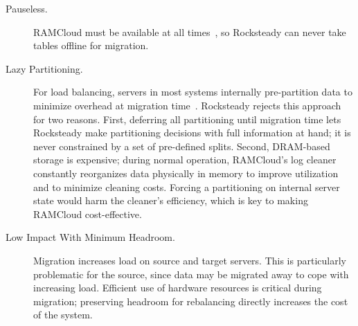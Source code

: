 \begin{description}
\item[Pauseless.]
RAMCloud must be available at all times~\cite{ramcloud-recovery}, so
Rocksteady can never take tables offline for migration.

\item[Lazy Partitioning.]
For load balancing, servers in most systems
internally pre-partition data
to minimize overhead at migration time~\cite{dynamo,farm-2014}.
Rocksteady rejects this approach for two reasons. First, deferring all
partitioning until migration time lets Rocksteady make partitioning
decisions with full information at hand; it is never constrained by a set
of pre-defined splits. Second, DRAM-based storage is expensive; during
normal operation, RAMCloud's log cleaner~\cite{ramcloud-lsm} constantly
reorganizes data physically in memory to improve utilization and to
minimize cleaning costs. Forcing a partitioning on internal server state
would harm the cleaner's efficiency, which is key to making RAMCloud
cost-effective.

\item[Low Impact With Minimum Headroom.]
Migration increases load on source and target servers. This is particularly
problematic for the source, since data may be migrated away to cope with
increasing load. Efficient use of hardware resources is critical during
migration; preserving headroom for rebalancing directly increases
the cost of the system.

\end{description}

